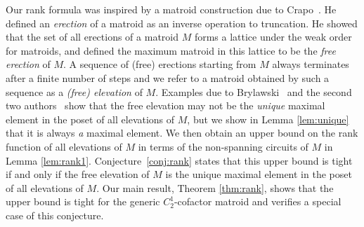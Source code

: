 \documentclass{daj}
\begin{document}
Our rank formula 
was inspired by a matroid construction due to
Crapo~\cite{C70}. He defined an {\em erection} of a matroid as an inverse operation to truncation.
He showed that the set of all erections of a matroid $M$ forms a lattice under the weak order for matroids,  and defined the maximum matroid in this lattice to be the {\em free erection} of $M$.
A sequence of (free) erections starting from $M$ always terminates after a finite number of steps and
we refer to a matroid obtained by 
such a sequence as a
{\em (free) elevation} of $M$.
Examples due to Brylawski~\cite[Figure 7.9]{B86} and the second two authors~\cite[Theorem 5.4]{JT} show that the free elevation may not be the {\em unique} maximal element in the poset of all elevations of $M$, but we show in Lemma \ref{lem:unique} that it is always {\em a} maximal element. %
We then obtain 
an upper bound  on the rank function of 
all elevations of $M$ in terms of the non-spanning circuits of  $M$ %
in Lemma \ref{lem:rank1}. Conjecture~\ref{conj:rank} states that this upper bound is tight if and only if the free elevation of $M$ is the unique maximal element in the poset of all elevations of $M$.
Our main result, Theorem \ref{thm:rank}, shows that the upper bound is tight for the generic $C_2^1$-cofactor matroid and verifies a special case of this conjecture.
\end{document}
